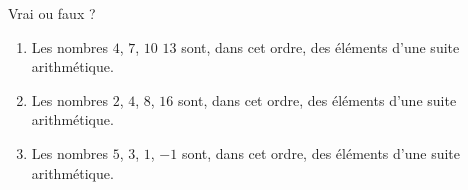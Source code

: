 
\begin{exercice}\label{exosmath-0163}

    Vrai ou faux ?
    \begin{enumerate}
        \item
            Les nombres \( 4\), \( 7\), \( 10\) \( 13\) sont, dans cet ordre, des éléments d'une suite arithmétique.
        \item
            Les nombres \( 2\), \( 4\), \( 8\), \( 16\) sont, dans cet ordre, des éléments d'une suite arithmétique.
        \item
            Les nombres \( 5\), \( 3\), \( 1\), \( -1\) sont, dans cet ordre, des éléments d'une suite arithmétique.
    \end{enumerate}

\end{exercice}
